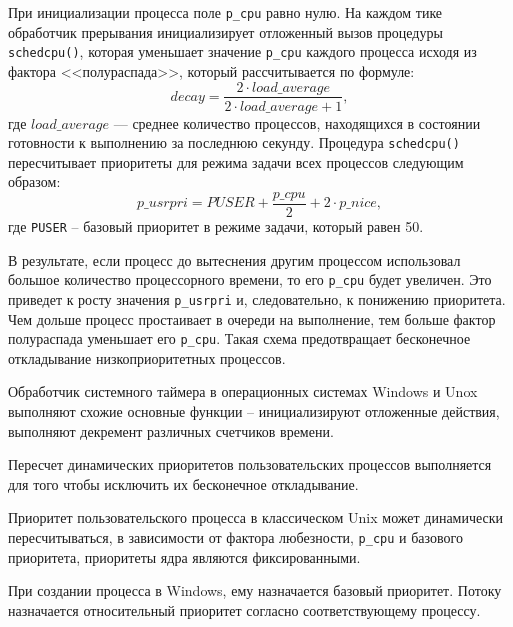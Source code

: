 При инициализации процесса поле \texttt{p\_cpu} равно нулю. На каждом тике обработчик прерывания инициализирует отложенный вы­зов процедуры \texttt{schedcpu()}, которая уменьшает значение \texttt{p\_cpu} каждого процесса
исходя из фактора <<полураспада>>, который рассчитывается по формуле:
\begin{equation}
	decay = \frac{2 \cdot load\_average}{2 \cdot load\_average + 1},
\end{equation}
где $load\_average$ --- среднее количество процессов, находящихся в состоянии готовности к выполнению за последнюю секунду. 
Процедура \texttt{schedcpu()} пересчитывает приоритеты для режима задачи всех процессов следующим образом:
\begin{equation}
	p\_usrpri = PUSER + \frac{p\_cpu}{2} + 2 \cdot p\_nice,
\end{equation}
где \texttt{PUSER} -- базовый приоритет в режиме задачи, который равен 50.

В результате, если процесс до вытеснения другим процессом использовал большое количество процессорного времени, то его \texttt{p\_cpu} будет увеличен. Это приведет к росту значения \texttt{p\_usrpri} и, следовательно, к понижению приоритета. Чем дольше процесс простаивает в очереди на выполнение, тем больше фактор полураспада уменьшает его \texttt{p\_cpu}. Такая схема предотвращает бесконечное откладывание низкоприоритетных процессов. 


Обработчик системного таймера в операционных системах Windows и Unox выполняют схожие основные функции -- инициализируют отложенные действия, выполняют декремент различных счетчиков времени.

Пересчет динамических приоритетов пользовательских процессов выполняется для того чтобы исключить их бесконечное откладывание.

Приоритет пользовательского процесса в классическом Unix может динамически пересчитываться, в зависимости от фактора любезности, \texttt{p\_cpu} и базового приоритета, приоритеты ядра являются фиксированными. 

При создании процесса в Windows, ему назначается базовый приоритет. Потоку назначается относительный приоритет согласно соответствующему процессу.
